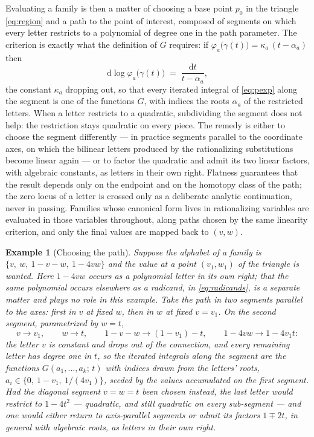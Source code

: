 \documentclass[11pt]{article}
\newcommand{\dd}{\mathrm{d}}
\newtheorem{example}[definition]{Example}
\begin{document}
Evaluating a family is then a matter of choosing a base point $p_0$
in the triangle \eqref{eq:region} and a path to the point of
interest, composed of segments on which every letter restricts to a
polynomial of degree one in the path parameter.  The criterion is
exactly what the definition of $G$ requires: if
$\varphi_a\big(\gamma(t)\big) = \kappa_a\,(t - \alpha_a)$ then
\begin{equation}
  \dd\log\varphi_a\big(\gamma(t)\big)
  \;=\; \frac{\dd t}{t - \alpha_a} ,
\end{equation}
the constant $\kappa_a$ dropping out, so that every iterated integral
of \eqref{eq:pexp} along the segment is one of the functions $G$,
with indices the roots $\alpha_a$ of the restricted letters.
When a letter restricts to a quadratic, subdividing the segment does
not help: the restriction stays quadratic on every piece.  The
remedy is either to choose the segment differently --- in practice
segments parallel to the coordinate axes, on which the bilinear
letters produced by the rationalizing substitutions become linear
again --- or to factor the quadratic and admit its two linear
factors, with algebraic constants, as letters in their own right.
Flatness guarantees that the result depends only on the endpoint and
on the homotopy class of the path; the zero locus of a letter is
crossed only as a deliberate analytic continuation, never in
passing.  Families whose canonical form lives in rationalizing
variables are evaluated in those variables throughout, along paths
chosen by the same linearity criterion, and only the final values
are mapped back to $(v,w)$.

\begin{example}[Choosing the path]
\label{ex:path}
Suppose the alphabet of a family is $\{v,\ w,\ 1-v-w,\ 1-4vw\}$ and
the value at a point $(v_1,w_1)$ of the triangle is wanted.  Here
$1-4vw$ occurs as a polynomial letter in its own right; that the same
polynomial occurs elsewhere as a radicand, in \eqref{eq:radicands},
is a separate matter and plays no role in this example.  Take
the path in two segments parallel to the axes: first in $v$ at
fixed $w$, then in $w$ at fixed $v = v_1$.  On the second segment,
parametrized by $w = t$,
\begin{equation}
  v \to v_1, \qquad
  w \to t, \qquad
  1-v-w \to (1-v_1) - t, \qquad
  1-4vw \to 1 - 4 v_1 t :
\end{equation}
the letter $v$ is constant and drops out of the connection, and
every remaining letter has degree one in $t$, so the iterated
integrals along the segment are the functions
$G(a_1,\dots,a_k;\,t)$ with indices drawn from the letters' roots,
$a_i \in \{0,\ 1-v_1,\ 1/(4v_1)\}$, seeded by the values
accumulated on the first segment.  Had the diagonal segment
$v = w = t$ been chosen instead, the last letter would restrict to
$1-4t^2$ --- quadratic, and still quadratic on every sub-segment
--- and one would either return to axis-parallel segments or admit
its factors $1 \mp 2t$, in general with algebraic roots, as letters
in their own right.
\end{example}
\end{document}
